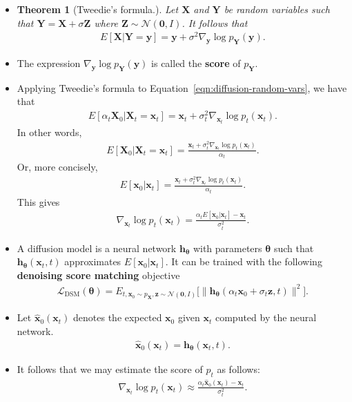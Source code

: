 \documentclass[10pt]{article}
\newtheorem{theorem}[lemma]{Theorem}
\newcommand{\ve}[1]{\mathbf{#1}}
\newcommand{\ves}[1]{\boldsymbol{#1}}
\newcommand{\mrm}[1]{\mathrm{#1}}
\newcommand{\mcal}[1]{\mathcal{#1}}
\begin{document}
\begin{itemize}
  \item \begin{theorem}[Tweedie's formula.] Let $\ve{X}$ and $\ve{Y}$ be random variables such that $\ve{Y} = \ve{X} + \sigma \ve{Z}$ where $\ve{Z} \sim \mcal{N}(\ve{0},I)$. It follows that
  \begin{align*}
    E[\ve{X}|\ve{Y} = \ve{y}] = \ve{y} + \sigma^2 \nabla_{\ve{y}} \log p_\ve{Y}(\ve{y}).
  \end{align*}    
  \end{theorem}

  \item The expression $\nabla_{\ve{y}} \log p_\ve{Y}(\ve{y})$ is called the \textbf{score} of $p_{\ve{Y}}$.

  \item Applying Tweedie's formula to Equation~\eqref{eqn:diffusion-random-vars}, we have that
  \begin{align*}
      E[\alpha_t \ve{X}_0 | \ve{X}_t = \ve{x}_t] = \ve{x}_t + \sigma_t^2 \nabla_{\ve{x}_t} \log p_t(\ve{x}_t).
  \end{align*}
  In other words,
  \begin{align*}
    E[\ve{X}_0 | \ve{X}_t = \ve{x}_t] = \frac{\ve{x}_t + \sigma_t^2 \nabla_{\ve{x}_t} \log p_t(\ve{x}_t)}{\alpha_t}.
  \end{align*}
  Or, more concisely,
  \begin{align}
    E[\ve{x}_0|\ve{x}_t] = \frac{\ve{x}_t + \sigma_t^2 \nabla_{\ve{x}_t} \log p_t(\ve{x}_t)}{\alpha_t}.
  \end{align}
  This gives
  \begin{align}
    \nabla_{\ve{x}_t} \log p_t(\ve{x}_t) = \frac{\alpha_t E[\ve{x}_0|\ve{x}_t] - \ve{x}_t}{\sigma_t^2}.
  \end{align}

  \item A diffusion model is a neural network $\ve{h}_{\ves{\theta}}$ with parameters $\ves{\theta}$ such that $\ve{h}_{\ves{\theta}}(\ve{x}_t, t)$ approximates $E[\ve{x}_0|\ve{x}_t]$. It can be trained with the following \textbf{denoising score matching} objective
  \begin{align*}
    \mcal{L}_{\mrm{DSM}}(\ves{\theta}) = E_{t, \ve{x}_0 \sim p_{\ve{X}}, \ve{z} \sim \mcal{N}(\ve{0},I)} \Big[ \big\| \ve{h}_{\ves{\theta}}(\alpha_t \ve{x}_0 + \sigma_t \ve{z}, t ) \big\|^2 \Big].
  \end{align*}

  \item Let $\hat{\ve{x}}_0(\ve{x}_t)$ denotes the expected $\ve{x}_0$ given $\ve{x}_t$ computed by the neural network.
  \begin{align*}
    \hat{\ve{x}}_0(\ve{x}_t) = \ve{h}_{\ves{\theta}}(\ve{x}_t, t).
  \end{align*}

  \item It follows that we may estimate the score of $p_t$ as follows:
  \begin{align}
    \nabla_{\ve{x}_t} \log p_t(\ve{x}_t) \approx \frac{\alpha_t \hat{\ve{x}}_0(\ve{x}_t) - \ve{x}_t}{\sigma_t^2}.
  \end{align}
\end{itemize}
\end{document}
